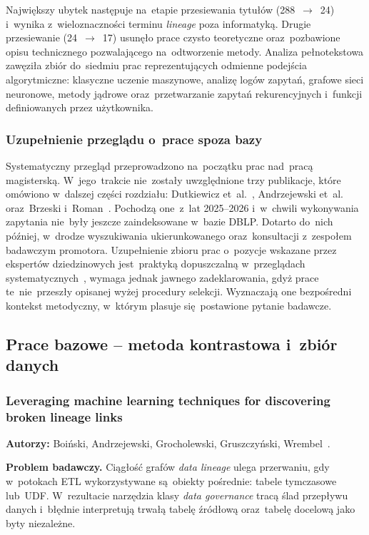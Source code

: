 \documentclass[polish,master,a4paper,oneside]{ppfcmthesis}
\renewcommand{\_}{\origtextunderscore\ifmmode\else\allowbreak\fi}
\begin{document}
Największy ubytek następuje na~etapie przesiewania tytułów (288~$\to$~24)
i~wynika z~wieloznaczności terminu \emph{lineage} poza informatyką.
Drugie przesiewanie (24~$\to$~17) usunęło prace czysto teoretyczne
oraz~pozbawione opisu technicznego pozwalającego na~odtworzenie metody.
Analiza pełnotekstowa zawęziła zbiór do~siedmiu prac reprezentujących
odmienne podejścia algorytmiczne: klasyczne uczenie maszynowe, analizę
logów zapytań, grafowe sieci neuronowe, metody jądrowe oraz~przetwarzanie
zapytań rekurencyjnych i~funkcji definiowanych przez użytkownika.

\subsubsection{Uzupełnienie przeglądu o~prace spoza bazy}
\label{sec:slr-uzupelnienie}

Systematyczny przegląd przeprowadzono na~początku prac nad~pracą magisterską.
W~jego~trakcie nie~zostały uwzględnione trzy publikacje, które omówiono
w~dalszej części rozdziału: Dutkiewicz et~al.~\cite{Dutkiewicz2026},
Andrzejewski et~al.~\cite{Andrzejewski2026} oraz~Brzeski
i~Roman~\cite{Brzeski2025}. Pochodzą one~z~lat 2025--2026 i~w~chwili
wykonywania zapytania nie~były jeszcze zaindeksowane w~bazie DBLP. Dotarto
do~nich później, w~drodze wyszukiwania ukierunkowanego oraz~konsultacji
z~zespołem badawczym promotora. Uzupełnienie zbioru prac o~pozycje
wskazane przez ekspertów dziedzinowych jest~praktyką dopuszczalną
w~przeglądach systematycznych~\cite{Kitchenham2007}, wymaga jednak jawnego zadeklarowania, gdyż
prace te~nie~przeszły opisanej wyżej procedury selekcji. Wyznaczają one
bezpośredni kontekst metodyczny, w~którym plasuje się~postawione pytanie
badawcze.

\subsection{Prace bazowe – metoda kontrastowa i~zbiór danych}

\subsubsection{Leveraging machine learning techniques for discovering broken
lineage links}
\noindent\textbf{Autorzy:} Boiński, Andrzejewski, Grocholewski,
Gruszczyński, Wrembel~\cite{Boinski2025}.

\noindent\textbf{Problem badawczy.}
Ciągłość grafów \emph{data lineage} ulega przerwaniu, gdy w~potokach ETL
wykorzystywane są~obiekty pośrednie: tabele tymczasowe lub~UDF. W~rezultacie
narzędzia klasy \emph{data governance} tracą ślad przepływu danych i~błędnie
interpretują trwałą tabelę źródłową oraz~tabelę docelową jako byty niezależne.
\end{document}
